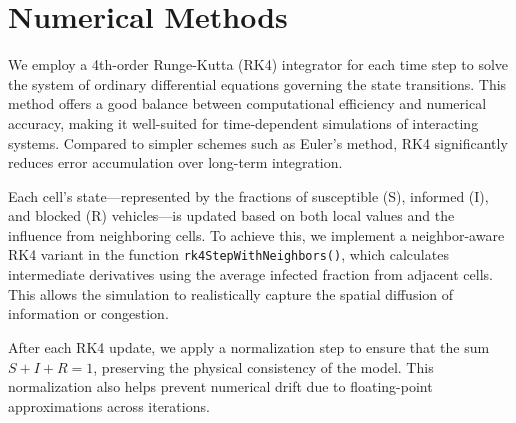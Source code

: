 \section{Numerical Methods}
We employ a 4th-order Runge-Kutta (RK4) integrator for each time step to solve the system of ordinary differential equations governing the state transitions.\cite{butcher2003numerical} This method offers a good balance between computational efficiency and numerical accuracy, making it well-suited for time-dependent simulations of interacting systems. Compared to simpler schemes such as Euler’s method, RK4 significantly reduces error accumulation over long-term integration.

Each cell’s state—represented by the fractions of susceptible (S), informed (I), and blocked (R) vehicles—is updated based on both local values and the influence from neighboring cells. To achieve this, we implement a neighbor-aware RK4 variant in the function \texttt{rk4StepWithNeighbors()}, which calculates intermediate derivatives using the average infected fraction from adjacent cells. This allows the simulation to realistically capture the spatial diffusion of information or congestion.

After each RK4 update, we apply a normalization step to ensure that the sum \( S + I + R = 1 \), preserving the physical consistency of the model. This normalization also helps prevent numerical drift due to floating-point approximations across iterations.

